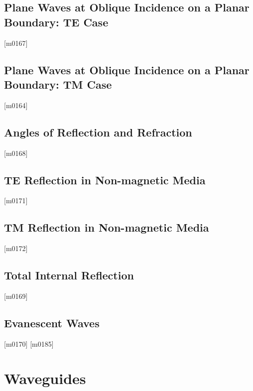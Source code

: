 \documentclass[10pt,letterpaper,twocolumn,openany]{book}
\theoremstyle{definition} %
\begin{document}
    \section{Plane Waves at Oblique Incidence on a Planar Boundary: TE Case}
{\color{blue}\tiny[m0167]}      
      \vfill\break
    \section{Plane Waves at Oblique Incidence on a Planar Boundary: TM Case}
{\color{blue}\tiny[m0164]}      
      \vfill\break
    \section{Angles of Reflection and Refraction}
{\color{blue}\tiny[m0168]}      
      \vfill\break
    \section{TE Reflection in Non-magnetic Media}
{\color{blue}\tiny[m0171]}      
      \vfill\break
    \section{TM Reflection in Non-magnetic Media}
{\color{blue}\tiny[m0172]}      
      \vfill\break
    \section{Total Internal Reflection}
{\color{blue}\tiny[m0169]}      
      \vfill\break
    \section{Evanescent Waves}
{\color{blue}\tiny[m0170]}      
{\color{blue}\tiny[m0185]}    
  \chapter{Waveguides}
  \thispagestyle{fancy} %
  \fancyhf{}            %
\end{document}
